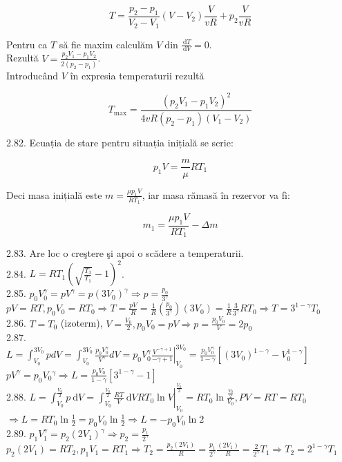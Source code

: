 \documentclass[10pt]{article}
\begin{document}
$$
T=\frac{p_{2}-p_{1}}{V_{2}-V_{1}}\left(V-V_{2}\right) \frac{V}{v R}+p_{2} \frac{V}{v R}
$$

Pentru ca $T$ să fie maxim calculăm $V \operatorname{din} \frac{\mathrm{~d} T}{\mathrm{~d} V}=0$.\\
Rezultă $V=\frac{p_{2} V_{1}-p_{1} V_{2}}{2\left(p_{2}-p_{1}\right)}$.\\
Introducând $V$ în expresia temperaturii rezultă

$$
T_{\max }=\frac{\left(p_{2} V_{1}-p_{1} V_{2}\right)^{2}}{4 v R\left(p_{2}-p_{1}\right)\left(V_{1}-V_{2}\right)}
$$

2.82. Ecuația de stare pentru situația inițială se scrie:

$$
p_{1} V=\frac{m}{\mu} R T_{1}
$$

Deci masa inițială este $m=\frac{\mu p_{1} V}{R T_{1}}$, iar masa rămasă în rezervor va fì:

$$
m_{1}=\frac{\mu p_{1} V}{R T_{1}}-\Delta m
$$

2.83. Are loc o creştere şi apoi o scădere a temperaturii.\\
2.84. $L=R T_{1}\left(\sqrt{\frac{T_{3}}{T_{1}}}-1\right)^{2}$.\\
2.85. $p_{0} V_{0}^{\gamma}=p V^{\gamma}=p\left(3 V_{0}\right)^{\gamma} \Rightarrow p=\frac{p_{0}}{3^{\gamma}}$\\
$p V=R T, p_{0} V_{0}=R T_{0} \Rightarrow T=\frac{p V}{R}=\frac{1}{R}\left(\frac{p_{0}}{3^{\gamma}}\right)\left(3 V_{0}\right)=\frac{1}{R} \frac{3}{3^{\gamma}} R T_{0} \Rightarrow T=3^{1-\gamma} T_{0}$\\
2.86. $T=T_{0}$ (izoterm), $V=\frac{V_{0}}{2}, p_{0} V_{0}=p V \Rightarrow p=\frac{p_{0} V_{0}}{V}=2 p_{0}$\\
2.87.\\
$L=\int_{V_{0}}^{3 V_{0}} p d V=\int_{V_{0}}^{3 V_{0}} \frac{p_{0} V_{0}^{\gamma}}{V^{\gamma}} d V=\left.p_{0} V_{0}^{\gamma} \frac{V^{-\gamma+1}}{-\gamma+1}\right|_{V_{0}} ^{3 V_{0}}=\frac{p_{0} V_{0}^{\gamma}}{1-\gamma}\left[\left(3 V_{0}\right)^{1-\gamma}-V_{0}^{1-\gamma}\right]$\\
$p V^{\gamma}=p_{0} V_{0}{ }^{\gamma} \Rightarrow L=\frac{p_{0} V_{0}}{1-\gamma}\left[3^{1-\gamma}-1\right]$\\
2.88. $L=\int_{V_{0}}^{\frac{V_{0}}{2}} p \mathrm{~d} V=\left.\int_{V_{0}}^{\frac{V_{0}}{2}} \frac{R T}{V} \mathrm{~d} V R T_{0} \ln V\right|_{V_{0}} ^{\frac{V_{0}}{2}}=R T_{0} \ln \frac{\frac{V_{0}}{2}}{V_{0}}, P V=R T=R T_{0}$\\
$\Rightarrow L=R T_{0} \ln \frac{1}{2}=p_{0} V_{0} \ln \frac{1}{2} \Rightarrow L=-p_{0} V_{0} \ln 2$\\
2.89. $p_{1} V_{1}^{\gamma}=p_{2}\left(2 V_{1}\right)^{\gamma} \Rightarrow p_{2}=\frac{p_{1}}{2^{\gamma}}$\\
$p_{2}\left(2 V_{1}\right)=R T_{2}, p_{1} V_{1}=R T_{1} \Rightarrow T_{2}=\frac{p_{2}\left(2 V_{1}\right)}{R}=\frac{p_{1}}{2^{\gamma}} \frac{\left(2 V_{1}\right)}{R}=\frac{2}{2^{\gamma}} T_{1} \Rightarrow T_{2}=2^{1-\gamma} T_{1}$
\end{document}
